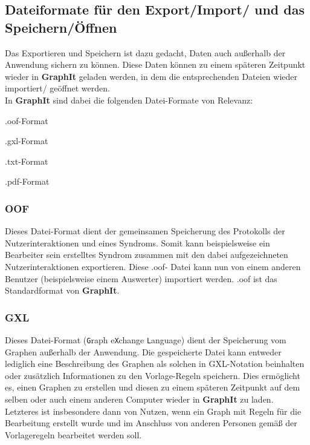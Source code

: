 \documentclass[enabledeprecatedfontcommands,fontsize=11pt,paper=a4,twoside]{scrartcl}
\newcounter{one}
\newcounter{two}[one]
\let\tempone\itemize
\let\temptwo\enditemize
\renewenvironment{itemize}{\tempone\addtolength{\itemsep}{-10.0pt}}{\temptwo}
\begin{document}
\subsection{Dateiformate für den Export/Import/ und das Speichern/Öffnen} 
Das Exportieren und Speichern ist dazu gedacht, Daten auch außerhalb der Anwendung sichern zu können. Diese Daten können zu einem späteren Zeitpunkt wieder in \textbf{GraphIt} geladen werden, in dem die entsprechenden Dateien wieder importiert/ geöffnet werden.\\
In \textbf{GraphIt} sind dabei die folgenden Datei-Formate von Relevanz: 
\begin{itemize}
\item .oof-Format
\item .gxl-Format
\item .txt-Format
\item .pdf-Format
\end{itemize}

	\subsubsection{OOF}
	Dieses Datei-Format dient der gemeinsamen Speicherung des Protokolls der Nutzerinteraktionen und eines Syndroms. Somit kann beispielsweise ein Bearbeiter sein erstelltes Syndrom zusammen mit den dabei aufgezeichneten Nutzerinteraktionen exportieren. Diese .oof- Datei kann nun von einem anderen Benutzer (beispielsweise einem Auswerter) importiert werden. .oof ist das Standardformat von \textbf{GraphIt}.
	
	\subsubsection{GXL}
	Dieses Datei-Format (\texttt{G}raph e\texttt{X}change \texttt{L}anguage) dient der Speicherung vom Graphen außerhalb der Anwendung. Die gespeicherte Datei kann entweder lediglich eine Beschreibung des Graphen als solchen in GXL-Notation beinhalten oder zusätzlich Informationen zu den Vorlage-Regeln speichern. Dies ermöglicht es, einen Graphen zu erstellen und diesen zu einem späteren Zeitpunkt auf dem selben oder auch einem anderen Computer wieder in \textbf{GraphIt} zu laden. Letzteres ist insbesondere dann von Nutzen, wenn ein Graph mit Regeln für die Bearbeitung erstellt wurde und im Anschluss von anderen Personen gemäß der Vorlageregeln bearbeitet werden soll.
	
\end{document}
